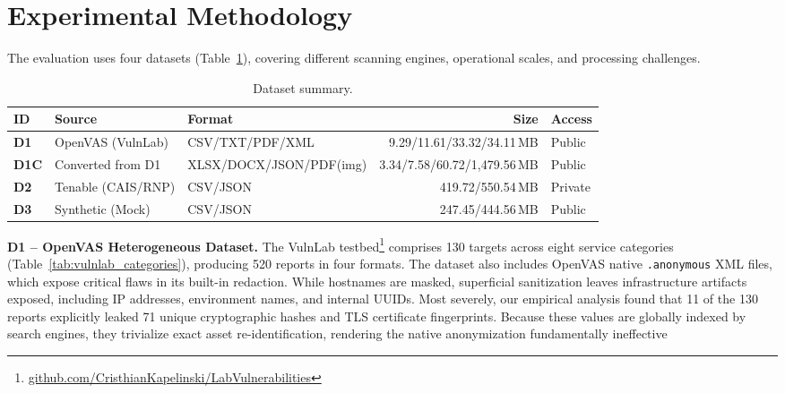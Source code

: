 \documentclass[12pt]{article}
\begin{document}
 

\section{Experimental Methodology}
\label{sec:method}

The evaluation uses four datasets (Table~\ref{tab:datasets_summary}), covering
different scanning engines, operational scales, and processing challenges.

\begin{table}[!htp]
\centering
\caption{Dataset summary.}
\label{tab:datasets_summary}
\scriptsize
\begin{tabular}{lllrl}
\toprule
\textbf{ID} & \textbf{Source} & \textbf{Format} & \textbf{Size} & \textbf{Access} \\
\midrule
\textbf{D1}  & OpenVAS (VulnLab) & CSV/TXT/PDF/XML & 9.29/11.61/33.32/34.11\,MB & Public \\
\textbf{D1C} & Converted from D1 & XLSX/DOCX/JSON/PDF(img) & 3.34/7.58/60.72/1{,}479.56\,MB & Public \\
\textbf{D2}  & Tenable (CAIS/RNP)& CSV/JSON & 419.72/550.54\,MB & Private \\
\textbf{D3}  & Synthetic (Mock)  & CSV/JSON & 247.45/444.56\,MB & Public \\
\bottomrule
\end{tabular}
\end{table}

\textbf{D1 -- OpenVAS Heterogeneous Dataset.}
The VulnLab testbed\footnote{\url{github.com/CristhianKapelinski/LabVulnerabilities}}
comprises 130 targets across eight service categories (Table~\ref{tab:vulnlab_categories}),
producing 520 reports in four formats. The dataset also includes OpenVAS native
\texttt{.anonymous} XML files, which expose critical flaws in its built-in redaction.
While hostnames are masked, superficial sanitization leaves infrastructure artifacts
exposed, including IP addresses, environment names, and internal UUIDs. Most severely,
our empirical analysis found that 11 of the 130 reports explicitly leaked 71 unique
cryptographic hashes and TLS certificate fingerprints. Because these values are globally
indexed by search engines, they trivialize exact asset re-identification, rendering
the native anonymization fundamentally ineffective
\end{document}
